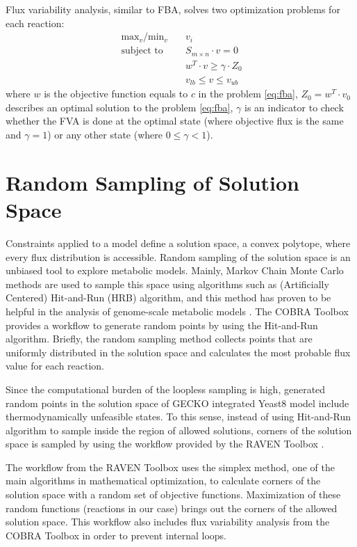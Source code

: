 \vspace{1cm}
Flux variability analysis, similar to FBA, solves two optimization problems for each reaction:
 \begin{align}
 \ \text{max}_v / \text{min}_v \quad & v_i \\
 \ \text{subject to} \quad & S_{m \times n} \cdot v=0 \\
 \ & w^T \cdot v \geq \gamma \cdot Z_0 \\
 \ & v_{lb} \leq v \leq v_{ub}
 \end{align}
\noindent where $w$ is the objective function equals to $c$ in the problem \ref{eq:fba}, $Z_0 = w^T \cdot v_0$ describes an optimal solution to the problem \ref{eq:fba}, $\gamma$ is an indicator to check whether the FVA is done at the optimal state (where objective flux is the same and $\gamma = 1$) or any other state (where $0 \leq \gamma < 1$).

\section{Random Sampling of Solution Space}
Constraints applied to a model define a solution space, a convex polytope, where every flux distribution is accessible. Random sampling of the solution space is an unbiased tool to explore metabolic models. Mainly, Markov Chain Monte Carlo methods are used to sample this space using algorithms such as (Artificially Centered) Hit-and-Run (HRB) \cite{kiatsupaibul2011analysis, saa2016ll} algorithm, and this method has proven to be helpful in the analysis of genome-scale metabolic models \cite{schellenberger2009use}. The COBRA Toolbox \cite{heirendt2019creation} provides a workflow to generate random points by using the Hit-and-Run algorithm. Briefly, the random sampling method collects points that are uniformly distributed in the solution space and calculates the most probable flux value for each reaction.

Since the computational burden of the loopless sampling is high, generated random points in the solution space of GECKO integrated Yeast8 model include thermodynamically unfeasible states. To this sense, instead of using Hit-and-Run algorithm to sample inside the region of allowed solutions, corners of the solution space is sampled by using the workflow provided by the RAVEN Toolbox \cite{wang2018raven}.

The workflow from the RAVEN Toolbox uses the simplex method, one of the main algorithms in mathematical optimization, to calculate corners of the solution space with a random set of objective functions. Maximization of these random functions (reactions in our case) brings out the corners of the allowed solution space. This workflow also includes flux variability analysis from the COBRA Toolbox in order to prevent internal loops.

